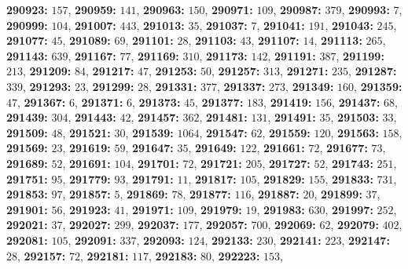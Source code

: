 \textsf{\bfseries 290923:} $157$, \textsf{\bfseries 290959:} $141$, \textsf{\bfseries 290963:} $150$, \textsf{\bfseries 290971:} $109$, \textsf{\bfseries 290987:} $379$, \textsf{\bfseries 290993:} $7$, \textsf{\bfseries 290999:} $104$, \textsf{\bfseries 291007:} $443$, \textsf{\bfseries 291013:} $35$, \textsf{\bfseries 291037:} $7$, \textsf{\bfseries 291041:} $191$, \textsf{\bfseries 291043:} $245$, \textsf{\bfseries 291077:} $45$, \textsf{\bfseries 291089:} $69$, \textsf{\bfseries 291101:} $28$, \textsf{\bfseries 291103:} $43$, \textsf{\bfseries 291107:} $14$, \textsf{\bfseries 291113:} $265$, \textsf{\bfseries 291143:} $639$, \textsf{\bfseries 291167:} $77$, \textsf{\bfseries 291169:} $310$, \textsf{\bfseries 291173:} $142$, \textsf{\bfseries 291191:} $387$, \textsf{\bfseries 291199:} $213$, \textsf{\bfseries 291209:} $84$, \textsf{\bfseries 291217:} $47$, \textsf{\bfseries 291253:} $50$, \textsf{\bfseries 291257:} $313$, \textsf{\bfseries 291271:} $235$, \textsf{\bfseries 291287:} $339$, \textsf{\bfseries 291293:} $23$, \textsf{\bfseries 291299:} $28$, \textsf{\bfseries 291331:} $377$, \textsf{\bfseries 291337:} $273$, \textsf{\bfseries 291349:} $160$, \textsf{\bfseries 291359:} $47$, \textsf{\bfseries 291367:} $6$, \textsf{\bfseries 291371:} $6$, \textsf{\bfseries 291373:} $45$, \textsf{\bfseries 291377:} $183$, \textsf{\bfseries 291419:} $156$, \textsf{\bfseries 291437:} $68$, \textsf{\bfseries 291439:} $304$, \textsf{\bfseries 291443:} $42$, \textsf{\bfseries 291457:} $362$, \textsf{\bfseries 291481:} $131$, \textsf{\bfseries 291491:} $35$, \textsf{\bfseries 291503:} $33$, \textsf{\bfseries 291509:} $48$, \textsf{\bfseries 291521:} $30$, \textsf{\bfseries 291539:} $1064$, \textsf{\bfseries 291547:} $62$, \textsf{\bfseries 291559:} $120$, \textsf{\bfseries 291563:} $158$, \textsf{\bfseries 291569:} $23$, \textsf{\bfseries 291619:} $59$, \textsf{\bfseries 291647:} $35$, \textsf{\bfseries 291649:} $122$, \textsf{\bfseries 291661:} $72$, \textsf{\bfseries 291677:} $73$, \textsf{\bfseries 291689:} $52$, \textsf{\bfseries 291691:} $104$, \textsf{\bfseries 291701:} $72$, \textsf{\bfseries 291721:} $205$, \textsf{\bfseries 291727:} $52$, \textsf{\bfseries 291743:} $251$, \textsf{\bfseries 291751:} $95$, \textsf{\bfseries 291779:} $93$, \textsf{\bfseries 291791:} $11$, \textsf{\bfseries 291817:} $105$, \textsf{\bfseries 291829:} $155$, \textsf{\bfseries 291833:} $731$, \textsf{\bfseries 291853:} $97$, \textsf{\bfseries 291857:} $5$, \textsf{\bfseries 291869:} $78$, \textsf{\bfseries 291877:} $116$, \textsf{\bfseries 291887:} $20$, \textsf{\bfseries 291899:} $37$, \textsf{\bfseries 291901:} $56$, \textsf{\bfseries 291923:} $41$, \textsf{\bfseries 291971:} $109$, \textsf{\bfseries 291979:} $19$, \textsf{\bfseries 291983:} $630$, \textsf{\bfseries 291997:} $252$, \textsf{\bfseries 292021:} $37$, \textsf{\bfseries 292027:} $299$, \textsf{\bfseries 292037:} $177$, \textsf{\bfseries 292057:} $700$, \textsf{\bfseries 292069:} $62$, \textsf{\bfseries 292079:} $402$, \textsf{\bfseries 292081:} $105$, \textsf{\bfseries 292091:} $337$, \textsf{\bfseries 292093:} $124$, \textsf{\bfseries 292133:} $230$, \textsf{\bfseries 292141:} $223$, \textsf{\bfseries 292147:} $28$, \textsf{\bfseries 292157:} $72$, \textsf{\bfseries 292181:} $117$, \textsf{\bfseries 292183:} $80$, \textsf{\bfseries 292223:} $153$, 
